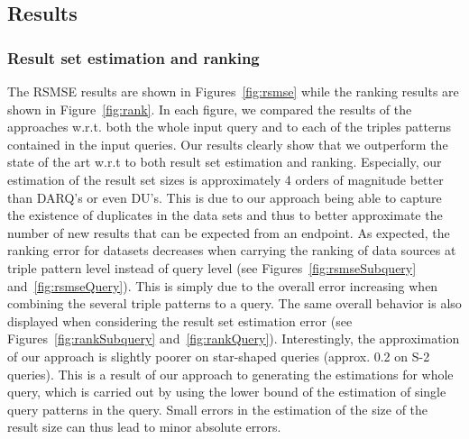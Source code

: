 \documentclass{sig-alternate}  %
\begin{document}
\subsection{Results}

\subsubsection{Result set estimation and ranking}
The RSMSE results are shown in Figures~\ref{fig:rsmse} while the ranking results are shown in Figure~\ref{fig:rank}.
In each figure, we compared the results of the approaches w.r.t. both the whole input query and to each of the triples patterns contained in the input queries.
Our results clearly show that we outperform the state of the art w.r.t to both result set estimation and ranking.
Especially, our estimation of the result set sizes is approximately 4 orders of magnitude better than DARQ's or even DU's. 
This is due to our approach being able to capture the existence of duplicates in the data sets and thus to better approximate the number of new results that can be expected from  an endpoint.
As expected, the ranking error for datasets decreases when carrying the ranking of data sources at triple pattern level instead of query level (see Figures~\ref{fig:rsmseSubquery} and~\ref{fig:rsmseQuery}).
This is simply due to the overall error increasing when combining the several triple patterns to a query.
The same overall behavior is also displayed when considering the result set estimation error (see Figures~\ref{fig:rankSubquery} and~\ref{fig:rankQuery}). 
Interestingly, the approximation of our approach is slightly poorer on star-shaped queries (approx. 0.2 on S-2 queries).
This is a result of our approach to generating the estimations for whole query, which is carried out by using the lower bound of the estimation of single query patterns in the query. 
Small errors in the estimation of the size of the result size can thus lead to minor absolute errors.
\end{document}
